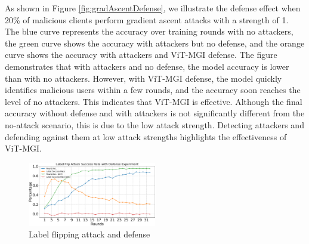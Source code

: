 \documentclass[conference]{IEEEtran}
\def\figLabelFlipDefense{0.5\textwidth}
\begin{document}
As shown in Figure \hyperref[fig:gradAscentDefense]{\ref{fig:gradAscentDefense}}, we illustrate the defense effect when 20\% of malicious clients perform gradient ascent attacks with a strength of 1. The blue curve represents the accuracy over training rounds with no attackers, the green curve shows the accuracy with attackers but no defense, and the orange curve shows the accuracy with attackers and ViT-MGI defense. The figure demonstrates that with attackers and no defense, the model accuracy is lower than with no attackers. However, with ViT-MGI defense, the model quickly identifies malicious users within a few rounds, and the accuracy soon reaches the level of no attackers. This indicates that ViT-MGI is effective. Although the final accuracy without defense and with attackers is not significantly different from the no-attack scenario, this is due to the low attack strength. Detecting attackers and defending against them at low attack strengths highlights the effectiveness of ViT-MGI.

\begin{figure}[htbp]
    \centerline{\includegraphics[width=\figLabelFlipDefense]{pics/005-LabelFlippingAttack-withDefense.pdf}}
    \vspace{-10px}  %
    \caption{Label flipping attack and defense\vspace{-8px}}
    \label{fig:labelFlipDefense}
\end{figure}

\end{document}
